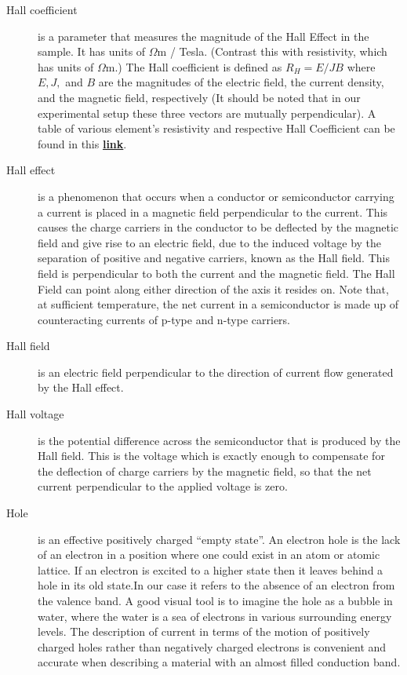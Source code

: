\documentclass{../lab}
\begin{document}
\begin{description}
    \item[Hall coefficient] is a parameter that measures the magnitude of the Hall Effect in the sample. It has units of $\Omega$m / Tesla. (Contrast this with resistivity, which has units of $\Omega$m.) The Hall coefficient is defined as $R_H = E/JB$ where $E, J,$ and $B$ are the magnitudes of the electric field, the current density, and the magnetic field, respectively (It should be noted that in our experimental setup these three vectors are mutually perpendicular). A table of various element's resistivity and respective Hall Coefficient can be found in this \href{http://experimentationlab.berkeley.edu/sites/default/files/SHE/tableforRH.png}{\textbf{link}}.

    \item[Hall effect] is a phenomenon that occurs when a conductor or semiconductor carrying a current is placed in a magnetic field perpendicular to the current. This causes the charge carriers in the conductor to be deflected by the magnetic field and give rise to an electric field, due to the induced voltage by the separation of positive and negative carriers, known as the Hall field. This field is perpendicular to both the current and the magnetic field. The Hall Field can point along either direction of the axis it resides on. Note that, at sufficient temperature, the net current in a semiconductor is made up of counteracting currents of p-type and n-type carriers.

    \item[Hall field] is an electric field perpendicular to the direction of current flow generated by the Hall effect.

    \item[Hall voltage] is the potential difference across the semiconductor that is produced by the Hall field. This is the voltage which is exactly enough to compensate for the deflection of charge carriers by the magnetic field, so that the net current perpendicular to the applied voltage is zero.

    \item[Hole] is an effective positively charged ``empty state''. An electron hole is the lack of an electron in a position where one could exist in an atom or atomic lattice. If an electron is excited to a higher state then it leaves behind a hole in its old state.In our case it refers to the absence of an electron from the valence band. A good visual tool is to imagine the hole as a bubble in water, where the water is a sea of electrons in various surrounding energy levels. The description of current in terms of the motion of positively charged holes rather than negatively charged electrons is convenient and accurate when describing a material with an almost filled conduction band.


\end{description}
\end{document}
